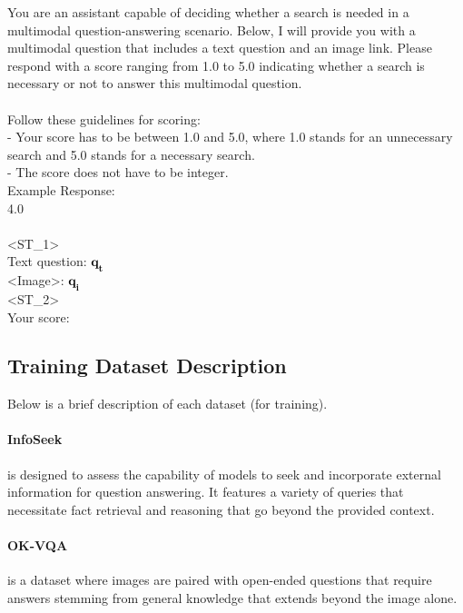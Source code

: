 \begin{framed}
\noindent\textcolor[rgb]{0.392, 0.471, 0.871}{You are an assistant capable of deciding whether a search is needed in a multimodal question-answering scenario. Below, I will provide you with a multimodal question that includes a text question and an image link.
Please respond with a score ranging from 1.0 to 5.0 indicating whether a search is necessary or not to answer this multimodal question. \\ \\
Follow these guidelines for scoring: \\
- Your score has to be between 1.0 and 5.0, where 1.0 stands for an unnecessary search and 5.0 stands for a necessary search.  \\
- The score does not have to be integer. \\
Example Response: \\
4.0 \\ \\
<ST\_1> \\
Text question: \textcolor{black}{$\bm{q_t}$} \\
<Image>: \textcolor{black}{$\bm{q_i}$} \\
<ST\_2> \\
Your score: }
\end{framed}


\subsection{Training Dataset Description}
\label{training_data_description}

Below is a brief description of each dataset (for training).

\paragraph{InfoSeek} is designed to assess the capability of models to seek and incorporate external information for question answering. It features a variety of queries that necessitate fact retrieval and reasoning that go beyond the provided context.

\paragraph{OK-VQA} is a dataset where images are paired with open-ended questions that require answers stemming from general knowledge that extends beyond the image alone.

